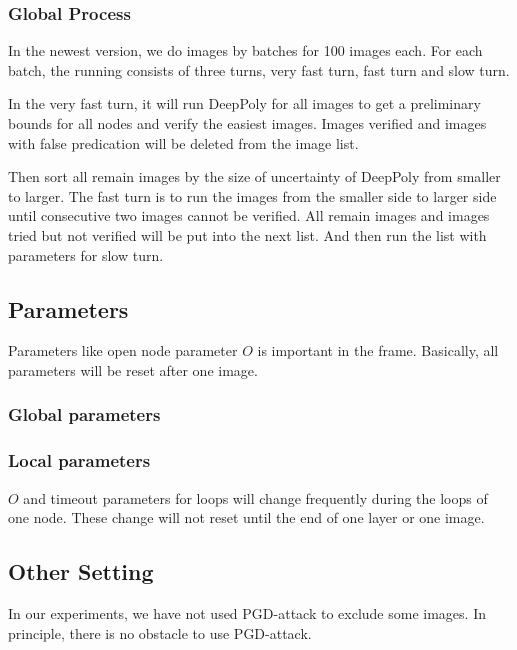 \documentclass{llncs}
\begin{document}
\subsubsection*{Global Process}

In the newest version, we do images by batches for 100 images each. For each batch, the running consists of three turns, very fast turn, fast turn and slow turn.

In the very fast turn, it will run DeepPoly for all images to get a preliminary bounds for all nodes and verify the easiest images. Images verified and images with false predication will be deleted from the image list.

Then sort all remain images by the size of uncertainty of DeepPoly from smaller to larger. The fast turn is to run the images from the smaller side to larger side until consecutive two images cannot be verified. All remain images and images tried but not verified will be put into the next list. And then run the list with parameters for slow turn.




\subsection{Parameters}

Parameters like open node parameter $O$ is important in the frame. Basically, all parameters will be reset after one image.

\subsubsection*{Global parameters}




\subsubsection*{Local parameters}

$O$ and timeout parameters for loops will change frequently during the loops of one node. These change will not reset until the end of one layer or one image.



\subsection{Other Setting}

In our experiments, we have not used PGD-attack to exclude some images. In principle, there is no obstacle to use PGD-attack.
\fi
\end{document}

